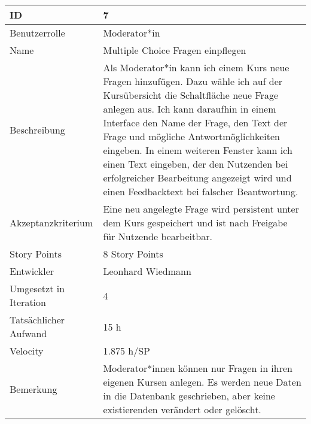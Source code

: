 \begin{tabularx}{\textwidth}{|p{}|X|}
	\hline
	ID & 7\\
	\hline
	Benutzerrolle & Moderator*in\\
	\hline
	Name & Multiple Choice Fragen einpflegen\\
	\hline
	Beschreibung & Als Moderator*in kann ich einem Kurs neue Fragen hinzufügen. Dazu wähle ich auf der Kursübersicht die Schaltfläche neue Frage anlegen aus. Ich kann daraufhin in einem Interface den Name der Frage, den Text der Frage und mögliche Antwortmöglichkeiten eingeben. In einem weiteren Fenster kann ich einen Text eingeben, der den Nutzenden bei erfolgreicher Bearbeitung angezeigt wird und einen Feedbacktext bei falscher Beantwortung.\\
	\hline
	Akzeptanzkriterium & Eine neu angelegte Frage wird persistent unter dem Kurs gespeichert und ist nach Freigabe für Nutzende bearbeitbar.\\
	\hline
	Story Points & 8 Story Points\\
	\hline
	Entwickler & Leonhard Wiedmann\\
	\hline
	Umgesetzt in Iteration & 4\\
	\hline
	Tatsächlicher Aufwand & 15 h\\
	\hline
	Velocity & 1.875 h/SP\\
	\hline
	Bemerkung & Moderator*innen können nur Fragen in ihren eigenen Kursen anlegen. Es werden neue Daten in die Datenbank geschrieben, aber keine existierenden verändert oder gelöscht.\\
	\hline
\end{tabularx}
\vspace{20pt}
